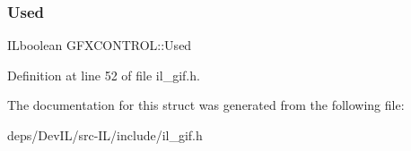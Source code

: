 \subsubsection{\texorpdfstring{Used}{Used}}
{\footnotesize\ttfamily I\+Lboolean G\+F\+X\+C\+O\+N\+T\+R\+O\+L\+::\+Used}



Definition at line 52 of file il\+\_\+gif.\+h.



The documentation for this struct was generated from the following file\+:\begin{DoxyCompactItemize}
\item 
deps/\+Dev\+I\+L/src-\/\+I\+L/include/il\+\_\+gif.\+h\end{DoxyCompactItemize}
